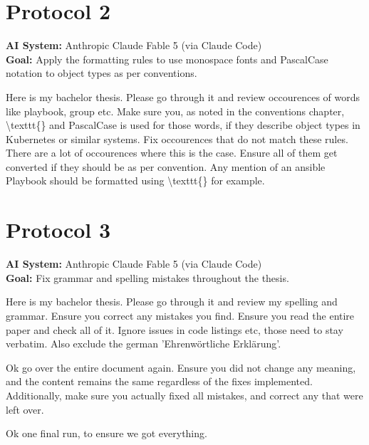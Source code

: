 \section*{Protocol 2}
\textbf{AI System:} Anthropic Claude Fable 5 (via Claude Code) \\
\textbf{Goal:} Apply the formatting rules to use monospace fonts and PascalCase notation to object types as per conventions.
\begin{tcolorbox}[colback=gray!5!white, colframe=gray!60!black, title=\textbf{Prompt}]
	Here is my bachelor thesis. Please go through it and review occourences of words like playbook, group etc. Make sure you, as noted in the conventions chapter, \textbackslash texttt\{\} and PascalCase is used for those words, if they describe object types in Kubernetes or similar systems. Fix occourences that do not match these rules. There are a lot of occourences where this is the case. Ensure all of them get converted if they should be as per convention. Any mention of an ansible Playbook should be formatted using \textbackslash texttt\{\} for example.
\end{tcolorbox}

\section*{Protocol 3}
\textbf{AI System:} Anthropic Claude Fable 5 (via Claude Code) \\
\textbf{Goal:} Fix grammar and spelling mistakes throughout the thesis.
\begin{tcolorbox}[colback=gray!5!white, colframe=gray!60!black, title=\textbf{Prompt}]
	Here is my bachelor thesis. Please go through it and review my spelling and grammar. Ensure you correct any mistakes you find. Ensure you read the entire paper and check all of it. Ignore issues in code listings etc, those need to stay verbatim. Also exclude the german 'Ehrenwörtliche Erklärung'.
\end{tcolorbox}
\begin{tcolorbox}[colback=gray!5!white, colframe=gray!60!black, title=\textbf{Follow-up prompt}]
	Ok go over the entire document again. Ensure you did not change any meaning, and the content remains the same regardless of the fixes implemented. Additionally, make sure you actually fixed all mistakes, and correct any that were left over.
\end{tcolorbox}
\begin{tcolorbox}[colback=gray!5!white, colframe=gray!60!black, title=\textbf{Follow-up prompt}]
	Ok one final run, to ensure we got everything.
\end{tcolorbox}
